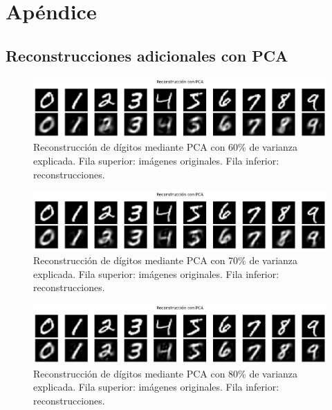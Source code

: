 \documentclass[11pt]{article}
\begin{document}
\appendix
\section{Apéndice}
\subsection{Reconstrucciones adicionales con PCA}
\label{sec:appendix_pca_reconstructions}
\begin{figure}[H]
    \centering
    \includegraphics[width=\textwidth]{figures/pca_reconstructions_60.png}
    \caption{Reconstrucción de dígitos mediante PCA con 60\% de varianza explicada. Fila superior: imágenes originales. Fila inferior: reconstrucciones.}
    \label{fig:appendix_pca_reconstructions_80}
\end{figure}

\begin{figure}[H]
    \centering
    \includegraphics[width=\textwidth]{figures/pca_reconstructions_70.png}
    \caption{Reconstrucción de dígitos mediante PCA con 70\% de varianza explicada. Fila superior: imágenes originales. Fila inferior: reconstrucciones.}
    \label{fig:appendix_pca_reconstructions_70}
\end{figure}

\begin{figure}[H]
    \centering
    \includegraphics[width=\textwidth]{figures/pca_reconstructions_80.png}
    \caption{Reconstrucción de dígitos mediante PCA con 80\% de varianza explicada. Fila superior: imágenes originales. Fila inferior: reconstrucciones.}
    \label{fig:appendix_pca_reconstructions_80}
\end{figure}
\end{document}
